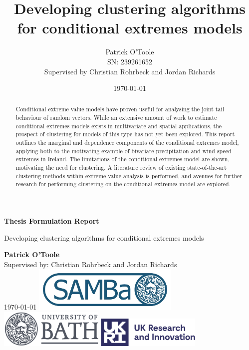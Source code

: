 \documentclass{article}
\title{Developing clustering algorithms for conditional extremes models}
\author{Patrick O'Toole \\ SN: 239261652 \\ Supervised by Christian Rohrbeck and Jordan Richards}
\date{\today}
\numberwithin{equation}{section}
\begin{document}
\begin{center}
  \huge
  \vspace{1.5cm}
  \textbf{Thesis Formulation Report}

  \vspace{0.4cm}
  \huge
  Developing clustering algorithms for conditional extremes models
  
  \Large    
  \vspace{0.8cm}
  \textbf{Patrick O'Toole} \\
  Supervised by: Christian Rohrbeck and Jordan Richards \\
  \today
  \vfill
  \includegraphics[width=7cm]{images/samba.jpg}\\
  \vspace{0.5cm}
  \includegraphics[width=5cm]{images/university-of-bath-logo.png}
  \hspace{1cm}
  \includegraphics[width=5cm]{images/UKRIlogo.png}
  \large   
  \vspace{1.5cm}
\end{center}

\newpage

\begin{abstract}
  Conditional extreme value models have proven useful for analysing the joint tail behaviour of random vectors. 
  While an extensive amount of work to estimate conditional extremes models exists in multivariate and spatial applications, the prospect of clustering for models of this type has not yet been explored. 
  This report outlines the marginal and dependence components of the conditional extremes model, applying both to the motivating example of bivariate precipitation and wind speed extremes in Ireland.
  The limitations of the conditional extremes model are shown, motivating the need for clustering.
  A literature review of existing state-of-the-art clustering methods within extreme value analysis is performed, and avenues for further research for performing clustering on the conditional extremes model are explored.
\end{abstract}
\end{document}
